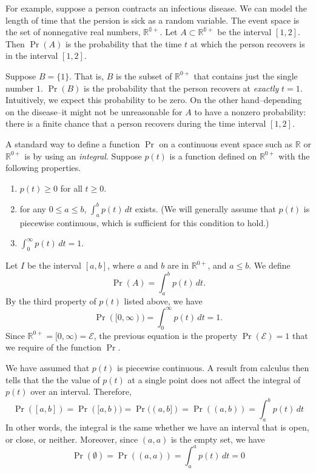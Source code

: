 For example, suppose a person contracts an
infectious disease. We can model the length
of time that the persion is sick as a random
variable.  The event space is the set of nonnegative
real numbers, $\mathbb{R^{0+}}$.
Let $A \subset \mathbb{R^{0+}}$ be the interval
$[1,2]$.
Then $\Pr(A)$ is the probability that the
time $t$ at which the person
recovers is in the interval $[1,2]$.

Suppose $B = \{1\}$.  That is, $B$ is the subset
of $\mathbb{R}^{0+}$ that contains just the single
number $1$.
$\Pr(B)$ is the probability that the person
recovers at \emph{exactly} $t=1$.
Intuitively, we expect this probability to be zero.
On the other hand--depending on the disease--it
might not be unreasonable for $A$ to have a nonzero
probability: there is a finite chance that a person
recovers during the time interval $[1,2]$.

A standard way to define a function $\Pr$ on 
a continuous event space such as $\mathbb{R}$
or $\mathbb{R}^{0+}$ is by using an
\emph{integral}.
Suppose $p(t)$ is a function defined on
$\mathbb{R}^{0+}$ with the following properties.
\begin{enumerate}
\item $p(t) \ge 0$ for all $t \ge 0$.
\item for any $0 \le a \le b$,
$\int_a^b p(t)\,dt$ exists.
(We will generally assume that $p(t)$ is piecewise
continuous, which is sufficient for this condition to
hold.)
\item $\int_0^{\infty} p(t)\,dt = 1$.
\end{enumerate}
Let $I$ be the interval $[a,b]$, where $a$
and $b$ are in $\mathbb{R}^{0+}$, and $a \le b$.
We define
\begin{equation}
  \Pr(A) = \int_a^b p(t)\,dt.
\end{equation}
By the third property of $p(t)$ listed above,
we have
\begin{equation}
  \Pr([0,\infty)) = \int_0^{\infty} p(t)\,dt = 1.
\end{equation}
Since $\mathbb{R}^{0+} = [0,\infty) = \mathcal{E}$,
the previous equation
is the property $\Pr(\mathcal{E})=1$ that
we require of the function $\Pr$.

We have assumed that $p(t)$ is piecewise continuous.
A result from calculus then tells that the
the value of $p(t)$ at a single point does not
affect the integral of $p(t)$ over an interval.
Therefore,
\begin{equation}
  \Pr([a,b]) = \Pr([a,b)) = \Pr((a,b]) = \Pr((a,b))
   = \int_a^b p(t)\,dt
\end{equation}
In other words, the integral is the same whether
we have an interval that is open, or close, or neither.
Moreover, since $(a,a)$ is the empty set, we have
\begin{equation}
  \Pr(\emptyset) = \Pr((a,a))
     = \int_a^a p(t)\,dt = 0
\end{equation}

